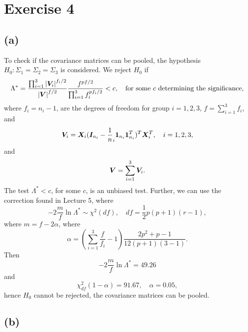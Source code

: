 \section*{Exercise 4}
\label{sec:exercise-4}

\subsection*{(a)}
\label{sec:a-3}

To check if the covariance matrices can be pooled, the hypothesis
$H_{0}: \Sigma_{1} =\Sigma_{2}  = \Sigma_{3}$ is considered. We
reject $H_{0}$ if
\begin{equation*}
  \Lambda^* = \frac{\prod_{i = 1}^{3} \left| \bm{V}_i \right|^{f_i/2}}{\left| \bm{V} \right|^{f/2}}
  \frac{f^{pf/2}}{\prod_{i = 1}^{3} f_i ^{pf_{i}/2}} < c,\quad
  \text{for some } c \text{ determining the significance},
\end{equation*}
where $f_{i} = n_{i} - 1$, are the degrees of freedom for group $i = 1,
2, 3$, $f = \sum_{i=1}^{3}f_{i}$, and
\begin{equation*}
  \bm{V}_{i} = \bm{X}_{i} (\bm{I}_{n_{i}}  - \frac 1n_{i}\bm{1}_{n_{i}} \bm{1}_{n_{i}}^{T})^{T}
  \bm{X}_{i}^{T},\quad i = 1,2,3,
\end{equation*}
and
\begin{equation*}
  \bm{V} = \sum_{i=1}^{3} \bm{V}_{i}.
\end{equation*}
The test $\Lambda^{*} < c$, for some $c$, is an unbiased test.
Further, we can use the correction found in Lecture 5, where
\begin{equation*}
  -2 \frac{m}{f} \ln \Lambda^{*} \sim \chi^{2}(df), \quad df = \frac{1}{2}p(p+1)(r-1),
\end{equation*}
where $m = f- 2\alpha$, where
\begin{equation*}
  \alpha = 
  \left(
    \sum_{i = 1}^{3} \frac{f}{f_{i}} - 1
  \right)
  \frac{2p^{2} + p -1}{12(p+1)(3-1)}.
\end{equation*}
Then 
\begin{equation*}
   -2 \frac{m}{f} \ln \Lambda^{*} = 49.26
\end{equation*}
and
\begin{equation*}
  \chi_{df}^{2}(1-\alpha) = 91.67, \quad \alpha = 0.05,
\end{equation*}
hence $H_{0}$ cannot be rejected, the covariance matrices can be
pooled. 
\subsection*{(b)}
\label{sec:b-3}

